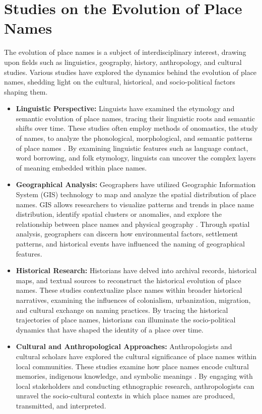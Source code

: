 \section{Studies on the Evolution of Place Names}
The evolution of place names is a subject of interdisciplinary interest, drawing upon fields such as linguistics, geography, history, anthropology, and cultural studies. Various studies have explored the dynamics behind the evolution of place names, shedding light on the cultural, historical, and socio-political factors shaping them.
\begin{itemize}
    \item {\textbf{Linguistic Perspective:}}
Linguists have examined the etymology and semantic evolution of place names, tracing their linguistic roots and semantic shifts over time. These studies often employ methods of onomastics, the study of names, to analyze the phonological, morphological, and semantic patterns of place names \cite{Gelling}. By examining linguistic features such as language contact, word borrowing, and folk etymology, linguists can uncover the complex layers of meaning embedded within place names.
	\item \textbf{Geographical Analysis:}
Geographers have utilized Geographic Information System (GIS) technology to map and analyze the spatial distribution of place names. GIS allows researchers to visualize patterns and trends in place name distribution, identify spatial clusters or anomalies, and explore the relationship between place names and physical geography \cite{Bolstad}. Through spatial analysis, geographers can discern how environmental factors, settlement patterns, and historical events have influenced the naming of geographical features.
	\item \textbf{Historical Research:}
Historians have delved into archival records, historical maps, and textual sources to reconstruct the historical evolution of place names. These studies contextualize place names within broader historical narratives, examining the influences of colonialism, urbanization, migration, and cultural exchange on naming practices. By tracing the historical trajectories of place names, historians can illuminate the socio-political dynamics that have shaped the identity of a place over time.
	\item \textbf{Cultural and Anthropological Approaches:}
Anthropologists and cultural scholars have explored the cultural significance of place names within local communities. These studies examine how place names encode cultural memories, indigenous knowledge, and symbolic meanings \cite{Gelling}. By engaging with local stakeholders and conducting ethnographic research, anthropologists can unravel the socio-cultural contexts in which place names are produced, transmitted, and interpreted.

\end{itemize}
